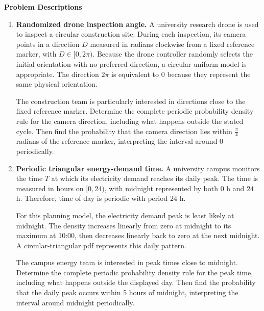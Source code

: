 

	
	
	
	\vspace*{-15mm}
	
	\begin{center}
		{\large\bfseries Problem Descriptions}
	\end{center}
	
	\vspace{-4mm}
	
	\begin{enumerate}[
		leftmargin=*,
		itemsep=2pt,
		parsep=0pt,
		topsep=2pt
		]
		
		\item \textbf{Randomized drone inspection angle.} A university research
		drone is used to inspect a circular construction site. During each
		inspection, its camera points in a direction $D$ measured in radians
		clockwise from a fixed reference marker, with $D\in[0,2\pi)$.
		Because the drone controller randomly selects the initial orientation with
		no preferred direction, a circular-uniform model is appropriate. The
		direction $2\pi$ is equivalent to $0$ because they represent the same
		physical orientation.
		
		The construction team is particularly interested in directions close to
		the fixed reference marker. Determine the complete periodic probability
		density rule for the camera direction, including what happens outside the
		stated cycle. Then find the probability that the camera direction lies
		within $\frac{\pi}{4}$ radians of the reference marker, interpreting the
		interval around $0$ periodically.
		
		\item \textbf{Periodic triangular energy-demand time.} A university campus
		monitors the time $T$ at which its electricity demand reaches its daily
		peak. The time is measured in hours on $[0,24)$, with midnight represented
		by both $0$ h and $24$ h. Therefore, time of day is periodic with period
		$24$ h.
		
		For this planning model, the electricity demand peak is least likely at
		midnight. The density increases linearly from zero at midnight to its
		maximum at 10:00, then decreases linearly back to zero at the next
		midnight. A circular-triangular pdf represents this daily pattern.
		
		The campus energy team is interested in peak times close to midnight.
		Determine the complete periodic probability density rule for the peak
		time, including what happens outside the displayed day. Then find the
		probability that the daily peak occurs within 5 hours of midnight,
		interpreting the interval around midnight periodically.
		
	\end{enumerate}
	
